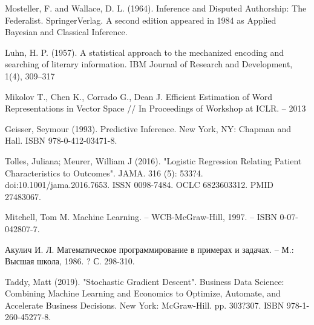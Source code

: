\documentclass[a4paper,12pt,preview]{report} %
\begin{document}
\begin{thebibliography}{3}
		Mosteller, F. and Wallace, D. L.
		(1964). Inference and Disputed Authorship: The Federalist. SpringerVerlag. A second edition appeared in
		1984 as Applied Bayesian and Classical Inference.
		
		Luhn, H. P. (1957). A statistical approach to the mechanized encoding
		and searching of literary information.
		IBM Journal of Research and Development, 1(4), 309--317
		
		Mikolov T., Chen K., Corrado G., Dean J. Efficient Estimation of Word Representations in Vector Space // In Proceedings of Workshop at ICLR. -- 2013
		
		
		Geisser, Seymour (1993). Predictive Inference. New York, NY: Chapman and Hall. ISBN 978-0-412-03471-8.
		
		Tolles, Juliana; Meurer, William J (2016). "Logistic Regression Relating Patient Characteristics to Outcomes". JAMA. 316 (5): 533?4. doi:10.1001/jama.2016.7653. ISSN 0098-7484. OCLC 6823603312. PMID 27483067.
		
		
		Mitchell, Tom M. Machine Learning. -- WCB-McGraw-Hill, 1997. -- ISBN 0-07-042807-7.
		
		Акулич И. Л. Математическое программирование в примерах и задачах. -- М.: Высшая школа, 1986. ? С. 298-310.
		
		 Taddy, Matt (2019). "Stochastic Gradient Descent". Business Data Science: Combining Machine Learning and Economics to Optimize, Automate, and Accelerate Business Decisions. New York: McGraw-Hill. pp. 303?307. ISBN 978-1-260-45277-8.
		
		
		
		
	\end{thebibliography}	
	
	
\end{document}
